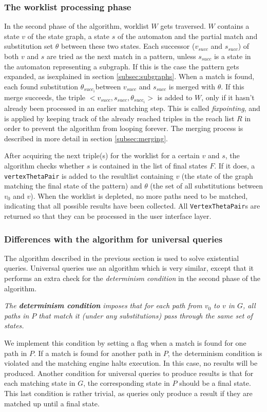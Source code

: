 \subsubsection*{The worklist processing phase}
In the second phase of the algorithm, worklist $W$ gets traversed. $W$ contains a state $v$ of the state graph, a state $s$ of the automaton and the partial match and substitution set $\theta$ between these two states. Each successor ($v_{succ}$ and $s_{succ}$) of both $v$ and $s$ are tried as the next match in a pattern, unless $s_{succ}$ is a state in the automaton representing a subgraph. If this is the case the pattern gets expanded, as isexplained in section \ref{subsec:subgraphs}. When a match is found, each found substitution $\theta_{succ_i}$between $v_{succ}$ and $s_{succ}$ is merged with $\theta$. If this merge succeeds, the triple $<v_{succ}, s_{succ}, \theta_{succ_i}>$ is added to $W$, only if it hasn't already been processed in an earlier matching step. This is called \textit{fixpointing}, and is applied by keeping track of the already reached triples in the reach list $R$ in order to prevent the algorithm from looping forever. The merging process is described in more detail in section \ref{subsec:merging}. 

After acquiring the next triple(s) for the worklist for a certain $v$ and $s$, the algorithm checks whether $s$ is contained in the list of final states $F$. If it does, a \texttt{vertexThetaPair} is added to the resultlist containing $v$ (the state of the graph matching the final state of the pattern) and $\theta$ (the set of all substitutions between $v_0$ and $v$). When the worklist is depleted, no more paths need to be matched, indicating that all possible results have been collected. All \texttt{VertexThetaPair}s are returned so that they can be processed in the user interface layer.

\subsubsection*{Differences with the algorithm for universal queries}
 The algorithm described in the previous section is used to solve existential queries. Universal queries use an algorithm which is very similar, except that it performs an extra check for the \textit{determinism condition} in the second phase of the algorithm. 
\begin{definition}
\textit{The \textbf{determinism condition} imposes that for each path from $v_0$ to $v$ in $G$, all paths in $P$ that match it (under any substitutions) pass through the same set of states.}
\end{definition}
 We implement this condition by setting a flag when a match is found for one path in $P$. If a match is found for another path in $P$, the determinism condition is violated and the matching engine halts execution. In this case, no results will be produced. Another condition for universal queries to produce results is that for each matching state in $G$, the corresponding state in $P$ should be a final state. This last condition is rather trivial, as queries only produce a result if they are matched up until a final state.

